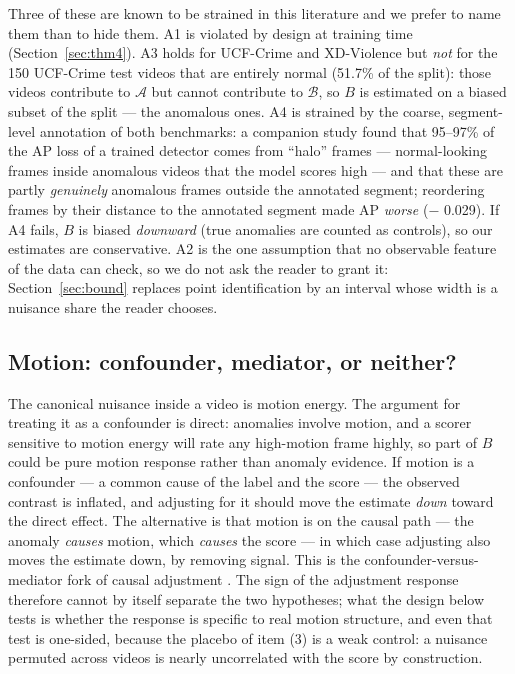 \documentclass[number,preprint,12pt]{elsarticle}
\begin{document}
Three of these are known to be strained in this literature and we prefer to name
them than to hide them. A1 is violated by design at training time (Section~\ref{sec:thm4}). A3
holds for UCF-Crime and XD-Violence but \emph{not} for the 150 UCF-Crime test videos
that are entirely normal (51.7\% of the split): those videos contribute to
\(\mathcal{A}\) but cannot
contribute to \(\mathcal{B}\), so \(B\) is estimated on a biased subset of the split --- the
anomalous ones. A4 is strained by the coarse, segment-level annotation of both
benchmarks: a companion study \citep{debiasvad2026} found that 95--97\% of the AP loss of a
trained detector comes from ``halo'' frames --- normal-looking frames inside
anomalous videos that the model scores high --- and that these are partly
\emph{genuinely} anomalous frames outside the annotated segment; reordering frames by
their distance to the annotated segment made AP \emph{worse} (\(-\) 0.029). If A4 fails,
\(B\) is biased \emph{downward} (true anomalies are counted as controls), so our
estimates are conservative. A2 is the one assumption that no observable feature of
the data can check, so we do not ask the reader to grant it: Section~\ref{sec:bound} replaces point
identification by an interval whose width is a nuisance share the reader chooses.

\subsection{Motion: confounder, mediator, or neither?}\label{sec:motion}

The canonical nuisance inside a video is motion energy. The argument for
treating it as a confounder is direct: anomalies involve motion, and a scorer
sensitive to motion energy will rate any high-motion frame highly, so part of
\(B\) could be pure motion response rather than anomaly evidence. If motion is a
confounder --- a common cause of the label and the score --- the observed
contrast is inflated, and adjusting for it should move the estimate \emph{down}
toward the direct effect. The alternative is that motion is on the causal path
--- the anomaly \emph{causes} motion, which \emph{causes} the score --- in which case
adjusting also moves the estimate down, by removing signal. This is the
confounder-versus-mediator fork of causal adjustment \citep{pearl2001direct}. The sign of the
adjustment response therefore cannot by itself separate the two hypotheses; what
the design below tests is whether the response is specific to real motion
structure, and even that test is one-sided, because the placebo of item (3) is a
weak control: a nuisance permuted across videos is nearly uncorrelated with the
score by construction.
\end{document}
